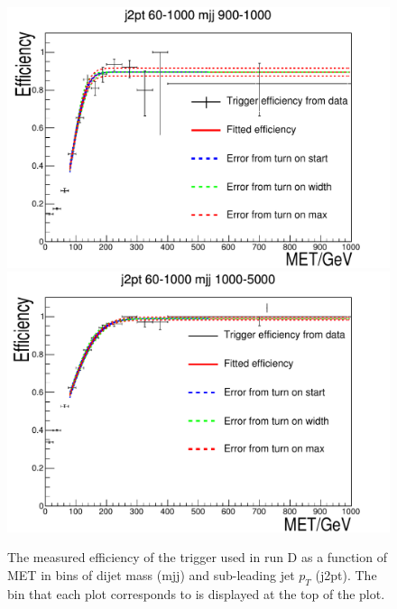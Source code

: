\begin{figure}
\begin{center}
    \includegraphics[width=.6\largefigwidth]{plots/parked/trigfitplots/hData_MET_1D_44D.pdf}
    \includegraphics[width=.6\largefigwidth]{plots/parked/trigfitplots/hData_MET_1D_45D.pdf}
    \caption{The measured efficiency of the trigger used in run D as a function of MET in bins of dijet mass (mjj) and sub-leading jet $p_{T}$ (j2pt). The bin that each plot corresponds to is displayed at the top of the plot.}
    \label{fig:trigfitplotsD2}
  \end{center}
\end{figure}
